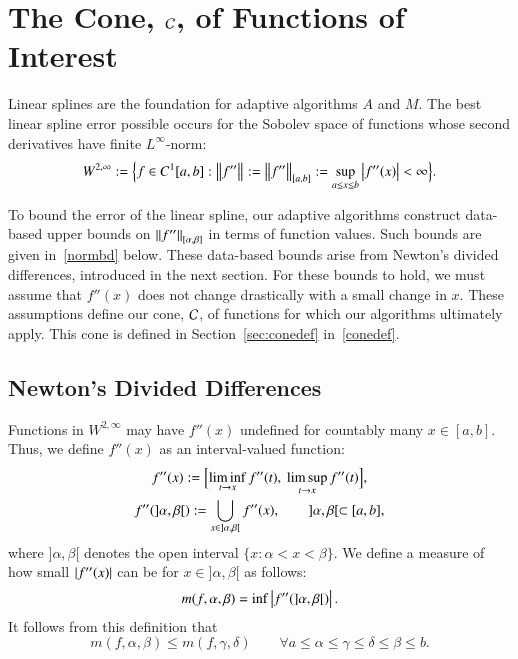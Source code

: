 \documentclass[review]{elsarticle}
\theoremstyle{definition}
\renewcommand{\cw}{W}
\begin{document}
\section{The Cone, $\cc$, of Functions of Interest} \label{sec:cone}

Linear splines are the foundation for adaptive algorithms $A$ and $M$. The best linear spline error possible occurs for the Sobolev space of functions whose second derivatives have finite $L^{\infty}$-norm:
\[
\cw^{2,\infty} := \Bigl \{f \in C^1[a,b] : \norm{f''} : = \norm[{[a,b]}]{f''} : = \sup_{a \le x \le b} \abs{f''(x)} <  \infty \Bigr\}.
\]

To bound the error of the linear spline, our adaptive algorithms construct data-based upper bounds on $\norm[{[\alpha,
\beta]}]{f''}$ in terms of function values.  Such bounds are given in~\eqref{normbd} below.  These data-based bounds arise from Newton's divided differences, introduced in the next section.  For these bounds to hold, we must  assume that $f''(x)$ does not change drastically with a small change in $x$.  These assumptions define our cone, $\cc$, of functions for which our algorithms ultimately apply.  This cone is defined in Section~\ref{sec:conedef} in~\eqref{conedef}.

\subsection{Newton's Divided Differences} \label{sec:ndd}

Functions in $\cw^{2,\infty}$ may have $f''(x)$ undefined for countably many $x \in [a,b]$.  Thus, we define $f''(x)$ as an interval-valued function:
\begin{gather*}
f''(x) := \Bigl[\liminf_{t \to x} f''(t), \ \limsup_{t \to x} f''(t) \Bigr], \\
 f''(]\alpha, \beta[) := \bigcup_ {x \in ]\alpha, \beta[} f''(x), \qquad  ]\alpha, \beta[ \subset [a,b],
\end{gather*}
where $]\alpha, \beta[$ denotes the open interval  $\{x:\alpha<x<\beta\}$.
We define a
measure of how small $\abs{f''(x)}$ can be for  $x \in ]\alpha, \beta[$ as follows:
\begin{equation} \label{minfppdef}
m(f,\alpha, \beta) = \inf \abs{f''(]\alpha, \beta[)}.
\end{equation}
It follows from this definition
that
\begin{equation} \label{mdec}
m(f,\alpha,\beta) \le m(f,\gamma,\delta) \qquad \forall a \le \alpha \le \gamma \le \delta \le \beta \le b.
\end{equation}
\end{document}
